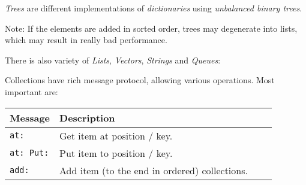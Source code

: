 \documentclass[10pt]{article}
\begin{document}
\begin{multicols*}{3}
\textit{Trees} are different implementations of \textit{dictionaries} using \textit{unbalanced binary trees}.

Note: If the elements are added in sorted order, trees may degenerate into lists, which may result in really bad performance.




\columnbreak

There is also variety of \textit{Lists}, \textit{Vectors}, \textit{Strings} and \textit{Queues}:

\vspace*{0.4cm}

\vspace*{0.4cm}

Collections have rich message protocol, allowing various operations. Most important are:


\vspace*{0.2cm}
\small{\begin{tabular}{ p{50pt} p{180pt} l l }
Message & Description
\\\hline\hline

\texttt{at:}
&
Get item at position / key.
\\\hline %

\texttt{at: Put:}
&
Put item to position / key.
\\\hline %

\texttt{add:}
&
Add item (to the end in ordered) collections.
\\\hline %


\end{tabular}}
\end{multicols*}
\end{document}
